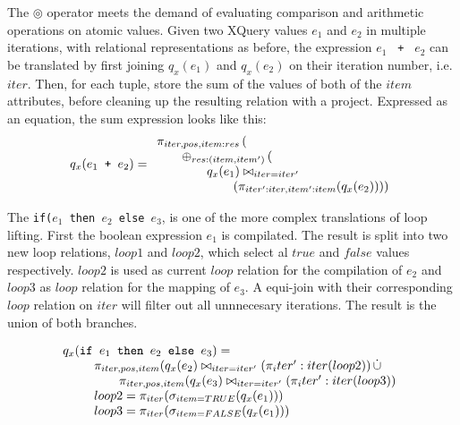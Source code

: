 The $\circledcirc$ operator meets the demand of evaluating comparison and arithmetic operations on atomic values.
Given two XQuery values $e_{1}$ and $e_{2}$ in multiple iterations, with relational representations as before,
the expression $e_{1}$ \texttt{ + } $e_{2}$ can be translated by first joining $q_{x}(e_{1})$ and $q_{x}(e_{2})$
on their iteration number, i.e. $iter$. Then, for each tuple, store the sum of the values of both of the $item$
attributes, before cleaning up the resulting relation with a project. Expressed as an equation, the sum expression looks like
this:
\begin{equation}
q_{x}(e_{1} \mbox{\texttt{ + }} e_{2}) =
\begin{array}{l}
\pi_{iter,pos,item:res}\left(\right. \\ \qquad
\oplus_{res:(item,item')}
\left( \right. \\ \qquad \qquad

	q_{x}(e_{1})
	\bowtie_{iter = iter'}
	 \\ \qquad \qquad \qquad
	\left.\left(\pi_{iter':iter, item':item}(q_{x}(e_{2}))
	\right)
\right)
\end{array}
\label{eq:ll:sumexpr}
\end{equation}

The \texttt{if(}$e_1$\texttt{ then }$e_2$\texttt{ else }$e_3$, is one of the more complex translations of loop
lifting. First the boolean expression $e_1$ is compilated. The result is split into two new loop relations,
$loop1$ and $loop2$, which select al $true$ and $false$ values respectively. $loop2$ is used as current $loop$
relation for the compilation of $e_2$ and $loop3$ as $loop$ relation for the mapping of $e_3$. A equi-join with
their corresponding $loop$ relation on $iter$ will filter out all unnnecesary iterations. The result is the union
of both branches.

\begin{equation}
\begin{array}{l}
q_{x}(\mbox{\texttt{if }}e_1\mbox{\texttt{ then }}e_2\mbox{\texttt{ else }}e_3) = \\ \qquad
\begin{array}{l}
\pi_{iter,pos,item}(q_{x}(e_2)\bowtie_{iter=iter'}(\pi_iter':iter(loop2))\,\dot\cup \\ \qquad
\pi_{iter,pos,item}(q_{x}(e_3)\bowtie_{iter=iter'}(\pi_iter':iter(loop3)) \\
loop2 = \pi_{iter}(\sigma_{item=TRUE}(q_{x}(e_1))) \\
loop3 = \pi_{iter}(\sigma_{item=FALSE}(q_{x}(e_1))) \\
\end{array}
\end{array}
\label{eq:ll:ifthenelse}
\end{equation}


